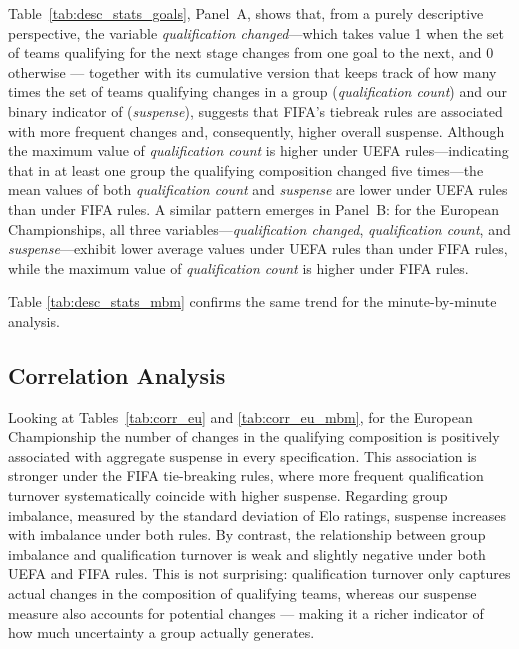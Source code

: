 \documentclass[11pt]{article}
\begin{document}
Table~\ref{tab:desc_stats_goals}, Panel~A, shows that, from a purely descriptive perspective, the variable \textit{qualification changed}—which takes value 1 when the set of teams qualifying for the next stage changes from one goal to the next, and 0 otherwise — together with its cumulative version that keeps track of how many times the set of teams qualifying changes  in a group (\textit{qualification count}) and our binary indicator of  (\textit{suspense}), suggests that FIFA’s tiebreak rules are associated with more frequent changes and, consequently, higher overall suspense. Although the maximum value of \textit{qualification count} is higher under UEFA rules—indicating that in at least one group the qualifying composition changed five times—the mean values of both \textit{qualification count} and \textit{suspense} are lower under UEFA rules than under FIFA rules. A similar pattern emerges in Panel~B: for the European Championships, all three variables—\textit{qualification changed}, \textit{qualification count}, and \textit{suspense}—exhibit lower average values under UEFA rules than under FIFA rules, while the maximum value of \textit{qualification count} is higher under FIFA rules.


Table \ref{tab:desc_stats_mbm} confirms the same trend for the minute-by-minute analysis.



\subsection{Correlation Analysis }

Looking at Tables~\ref{tab:corr_eu} and \ref{tab:corr_eu_mbm}, for the European Championship the number of changes in the qualifying composition is positively associated with aggregate suspense in every specification. This association is stronger under the FIFA tie-breaking rules, where more frequent qualification turnover systematically coincide with higher suspense. Regarding group imbalance, measured by the standard deviation of Elo ratings, suspense increases with imbalance under both rules. By contrast, the relationship between group imbalance and qualification turnover is weak and slightly negative under both UEFA and FIFA rules. This is not surprising: qualification turnover only captures actual changes in the composition of qualifying teams, whereas our suspense measure also accounts for potential changes — making it a richer indicator of how much uncertainty a group actually generates.
\end{document}
